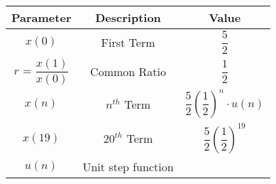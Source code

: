 \begin{tabular}{|c|c|c|}
    \hline
    \textbf{Parameter} & \textbf{Description} & \textbf{Value} \\
    \hline
     \(x(0)\) & First Term &\(\dfrac{5}{2}\) \\
    \hline
     \(r\) = \(\dfrac{x(1)}{x(0)}\) & Common Ratio & \(\dfrac{1}{2}\) \\
    \hline
      \(x(n)\) & \(n^{th}\) Term & \(\dfrac{5}{2}\left(\dfrac{1}{2}\right)^n \cdot u(n)\) \\
    \hline
     \(x(19)\) & \(20^{th}\) Term &\(\dfrac{5}{2} \left(\dfrac{1}{2}\right)^{19}\) \\
    \hline
     \(u(n)\) &Unit step function & \\
    \hline
  \end{tabular}
